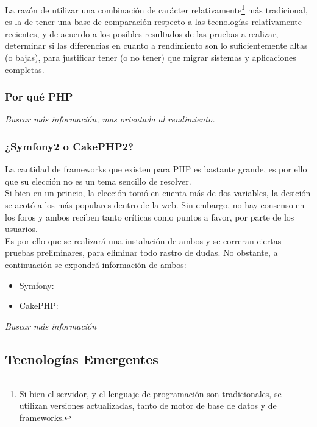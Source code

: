La razón de utilizar una combinación de carácter relativamente\footnote{Si bien el servidor, y el lenguaje 
de programación son tradicionales, se utilizan versiones actualizadas, tanto de motor de base de datos y de 
frameworks.} más tradicional, es la de tener una base de comparación respecto a las tecnologías relativamente 
recientes, y de acuerdo a los posibles resultados de las pruebas a realizar, determinar si las diferencias 
en cuanto a rendimiento son lo suficientemente altas (o bajas), para justificar tener (o no tener) que 
migrar sistemas y aplicaciones completas.\\


\subsubsection{Por qué PHP}
\textit{Buscar más información, mas orientada al rendimiento.}


\subsubsection{¿Symfony2 o CakePHP2?}

La cantidad de frameworks que existen para PHP es bastante grande, es por ello que su elección no es un
tema sencillo de resolver.\\

Si bien en un princio, la elección tomó en cuenta más de dos variables, la desición se acotó a los más
populares dentro de la web. Sin embargo, no hay consenso en los foros y ambos reciben tanto críticas como 
puntos a favor, por parte de los usuarios.\\

Es por ello que se realizará una instalación de ambos y se correran ciertas pruebas preliminares, para eliminar
todo rastro de dudas. No obstante, a continuación  se expondrá información de ambos:

\begin{itemize}
 \item Symfony: %
 \item CakePHP: %
\end{itemize}


\textit{Buscar más información}

\subsection{Tecnologías Emergentes}

